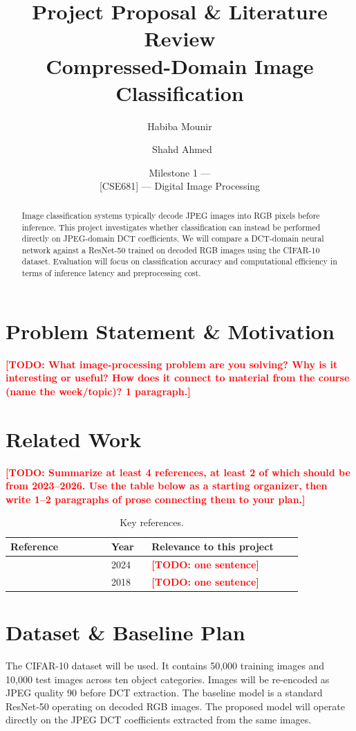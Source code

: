 \documentclass[11pt]{article}
\title{\LARGE Project Proposal \& Literature Review \\[4pt]
\large Compressed-Domain Image Classification}
\author{
  Habiba Mounir \and
  \ Shahd Ahmed \and
  \todo{Student C Full Name}
}
\date{Milestone 1 --- \todo{Date} \\{} [CSE681] --- Digital Image Processing}
\newcommand{\todo}[1]{\textcolor{red}{\textbf{[TODO: #1]}}}
\begin{document}
\maketitle

\begin{abstract}
Image classification systems typically decode JPEG images into RGB pixels before inference. This project investigates whether classification can instead be performed directly on JPEG-domain DCT coefficients. We will compare a DCT-domain neural network against a ResNet-50 trained on decoded RGB images using the CIFAR-10 dataset. Evaluation will focus on classification accuracy and computational efficiency in terms of inference latency and preprocessing cost.
\end{abstract}

\section{Problem Statement \& Motivation}
\label{sec:motivation}
\todo{What image-processing problem are you solving? Why is it interesting or useful?
How does it connect to material from the course (name the week/topic)? 1 paragraph.}

\section{Related Work}
\label{sec:related}
\todo{Summarize at least 4 references, at least 2 of which should be from 2023--2026.
Use the table below as a starting organizer, then write 1--2 paragraphs of prose
connecting them to your plan.}

\begin{table}[h]
\centering
\caption{Key references.}
\label{tab:refs}
\begin{tabular}{@{}p{0.30\linewidth}p{0.12\linewidth}p{0.45\linewidth}@{}}
\toprule
\textbf{Reference} & \textbf{Year} & \textbf{Relevance to this project} \\
\midrule
\citep{example2024} & 2024 & \todo{one sentence} \\
\citep{example2018}  & 2018 & \todo{one sentence} \\
\bottomrule
\end{tabular}
\end{table}

\section{Dataset \& Baseline Plan}
\label{sec:data}
The CIFAR-10 dataset will be used. It contains 50,000 training images and 10,000 test images across ten object categories. Images will be re-encoded as JPEG quality 90 before DCT extraction. The baseline model is a standard ResNet-50 operating on decoded RGB images. The proposed model will operate directly on the JPEG DCT coefficients extracted from the same images.
\end{document}
